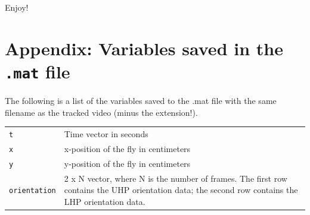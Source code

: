 \documentclass[letterpaper, 11pt]{article}
\begin{document}
\noindent Enjoy!


\section{Appendix: Variables saved in the \texttt{.mat} file}

The following is a list of the variables saved to the .mat file with the same filename as the
tracked video (minus the extension!).

\begin{center}
\begin{longtable}{ p{5cm}  p{8cm} }
    \texttt{t} & Time vector in seconds\\
    \texttt{x} & x-position of the fly in centimeters\\
    \texttt{y} & y-position of the fly in centimeters\\
    \texttt{orientation}& 2 x N vector, where N is the number of frames.  The first row contains the UHP orientation data; the second row contains
    the LHP orientation data.\\



\end{longtable}
\end{center}
\end{document}
